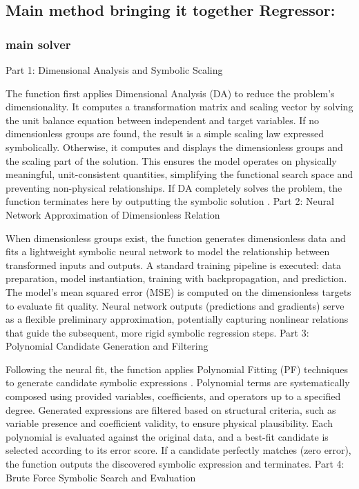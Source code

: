 \documentclass{article}
\begin{document}
\subsection{Main method bringing it together Regressor: }

\subsubsection{main solver}

Part 1: Dimensional Analysis and Symbolic Scaling

The function first applies Dimensional Analysis (DA) to reduce the problem’s dimensionality. It computes a transformation matrix and scaling vector by solving the unit balance equation between independent and target variables. If no dimensionless groups are found, the result is a simple scaling law expressed symbolically. Otherwise, it computes and displays the dimensionless groups and the scaling part of the solution. This ensures the model operates on physically meaningful, unit-consistent quantities, simplifying the functional search space and preventing non-physical relationships. If DA completely solves the problem, the function terminates here by outputting the symbolic solution \cite{udrescu2020}.
Part 2: Neural Network Approximation of Dimensionless Relation

When dimensionless groups exist, the function generates dimensionless data and fits a lightweight symbolic neural network to model the relationship between transformed inputs and outputs. A standard training pipeline is executed: data preparation, model instantiation, training with backpropagation, and prediction. The model’s mean squared error (MSE) is computed on the dimensionless targets to evaluate fit quality. Neural network outputs (predictions and gradients) serve as a flexible preliminary approximation, potentially capturing nonlinear relations that guide the subsequent, more rigid symbolic regression steps.
Part 3: Polynomial Candidate Generation and Filtering

Following the neural fit, the function applies Polynomial Fitting (PF) techniques to generate candidate symbolic expressions \cite{udrescu2020}. Polynomial terms are systematically composed using provided variables, coefficients, and operators up to a specified degree. Generated expressions are filtered based on structural criteria, such as variable presence and coefficient validity, to ensure physical plausibility. Each polynomial is evaluated against the original data, and a best-fit candidate is selected according to its error score. If a candidate perfectly matches (zero error), the function outputs the discovered symbolic expression and terminates.
Part 4: Brute Force Symbolic Search and Evaluation
\end{document}
